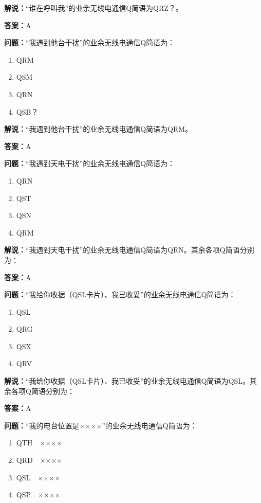 \textbf{解说：}“谁在呼叫我”的业余无线电通信Q简语为QRZ？。

\textbf{答案：}A

\textbf{问题：}“我遇到他台干扰”的业余无线电通信Q简语为：

\begin{enumerate}[label=\Alph*), leftmargin=3em]
	\item QRM
	\item QSM
	\item QRN
	\item QSB？
\end{enumerate}

\textbf{解说：}“我遇到他台干扰”的业余无线电通信Q简语为QRM。

\textbf{答案：}A

\textbf{问题：}“我遇到天电干扰”的业余无线电通信Q简语为：

\begin{enumerate}[label=\Alph*), leftmargin=3em]
	\item QRN
	\item QST
	\item QSN
	\item QRM
\end{enumerate}

\textbf{解说：}“我遇到天电干扰”的业余无线电通信Q简语为QRN。其余各项Q简语分别为：

\textbf{答案：}A

\textbf{问题：}“我给你收据（QSL卡片）、我已收妥”的业余无线电通信Q简语为：

\begin{enumerate}[label=\Alph*), leftmargin=3em]
	\item QSL
	\item QRG
	\item QSX
	\item QRV
\end{enumerate}

\textbf{解说：}“我给你收据（QSL卡片）、我已收妥”的业余无线电通信Q简语为QSL。其余各项Q简语分别为：

\textbf{答案：}A

\textbf{问题：}“我的电台位置是××××”的业余无线电通信Q简语为：

\begin{enumerate}[label=\Alph*), leftmargin=3em]
	\item QTH　××××
	\item QRD　××××
	\item QSL　××××
	\item QSP　××××
\end{enumerate}

